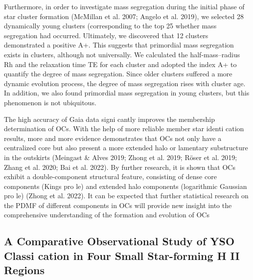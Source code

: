 \documentclass[../Main.tex]{subfiles}
\begin{document}
{Furthermore, in order to investigate mass segregation during
the initial phase of star cluster formation (McMillan et al. 2007;
Angelo et al. 2019), we selected 28 dynamically young clusters
(corresponding to the top 25%
whether mass segregation had occurred. Ultimately, we
discovered that 12 clusters demonstrated a positive A+. This
suggests that primordial mass segregation exists in clusters,
although not universally.
We calculated the half-mass–radius Rh and the relaxation
time TE for each cluster and adopted the index A+ to
quantify the degree of mass segregation. Since older
clusters suffered a more dynamic evolution process, the
degree of mass segregation rises with cluster age. In
addition, we also found primordial mass segregation in
young clusters, but this phenomenon is not ubiquitous.

The high accuracy of Gaia data signi cantly improves the
membership determination of OCs. With the help of more
reliable member star identi cation results, more and more
evidence demonstrates that OCs not only have a centralized
core but also present a more extended halo or lamentary
substructure in the outskirts (Meingast & Alves 2019; Zhong
et al. 2019; Röser et al. 2019; Zhang et al. 2020; Bai et al.
2022). By further research, it is shown that OCs exhibit a
double-component structural feature, consisting of dense core
components (Kings pro le) and extended halo components
(logarithmic Gaussian pro le) (Zhong et al. 2022). It can be
expected that further statistical research on the PDMF of
different components in OCs will provide new insight into the
comprehensive understanding of the formation and evolution
of OCs

\subsection{A Comparative Observational Study of YSO Classi cation
in Four Small Star-forming H II Regions}


}
\end{document}
